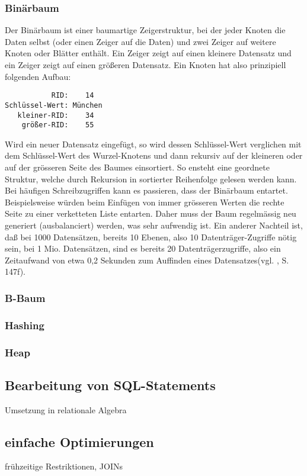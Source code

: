 \subsubsection{Binärbaum}
Der Binärbaum ist einer baumartige Zeigerstruktur, bei der jeder Knoten die Daten selbst (oder einen Zeiger auf die Daten) und zwei Zeiger auf weitere Knoten oder Blätter enthält. Ein Zeiger zeigt auf einen kleinere Datensatz und ein Zeiger zeigt auf einen größeren Datensatz. Ein Knoten hat also prinzipiell folgenden Aufbau:
\begin{lstlisting}
           RID:    14
Schlüssel-Wert: München
   kleiner-RID:    34
    größer-RID:    55
\end{lstlisting}
Wird ein neuer Datensatz eingefügt, so wird dessen Schlüssel-Wert verglichen mit dem Schlüssel-Wert des Wurzel-Knotens und dann rekursiv auf der kleineren oder auf der grösseren Seite des Baumes einsortiert. So ensteht eine geordnete Struktur, welche durch Rekursion in sortierter Reihenfolge gelesen werden kann. Bei häufigen Schreibzugriffen kann es passieren, dass der Binärbaum entartet. Beispielsweise würden beim Einfügen von immer grösseren Werten die rechte Seite zu einer verketteten Liste entarten. Daher muss der Baum regelmässig neu generiert (ausbalanciert) werden, was sehr aufwendig ist. Ein anderer Nachteil ist, daß bei 1000 Datensätzen, bereits 10 Ebenen, also 10 Datenträger-Zugriffe nötig sein, bei 1 Mio. Datensätzen, sind es bereits 20 Datenträgerzugriffe, also ein Zeitaufwand von etwa 0,2 Sekunden zum Auffinden eines Datensatzes(vgl. \cite{Sauer1998}, S. 147f).
\subsubsection{B-Baum}
\subsubsection{Hashing} 
\subsubsection{Heap} 

\subsection{Bearbeitung von SQL-Statements}
Umsetzung in relationale Algebra

\subsection{einfache Optimierungen}
frühzeitige Restriktionen, JOINs
